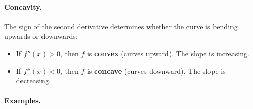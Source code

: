 \documentclass[11pt,letterpaper]{article}
\begin{document}
\paragraph{Concavity.}  
The sign of the second derivative determines whether the curve is bending upwards or downwards:

\begin{itemize}
    \item If $f''(x) > 0$, then $f$ is \textbf{convex} (curves upward). The slope is increasing.
    \item If $f''(x) < 0$, then $f$ is \textbf{concave} (curves downward). The slope is decreasing.
\end{itemize}

\paragraph{Examples.}
\end{document}
